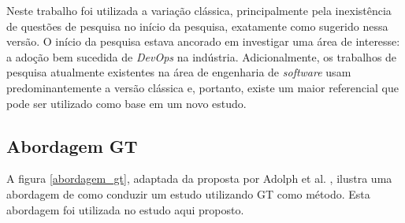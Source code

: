 Neste trabalho foi utilizada a variação clássica, principalmente pela
inexistência de questões de pesquisa no início da pesquisa, exatamente como
sugerido nessa versão. O início da pesquisa estava ancorado em investigar uma
área de interesse: a adoção bem sucedida de \textit{DevOps} na indústria.
Adicionalmente, os trabalhos de pesquisa atualmente existentes na área
de engenharia de \textit{software} usam predominantemente a versão clássica
\cite{stol2016grounded} e, portanto, existe um maior referencial que pode ser
utilizado como base em um novo estudo.

\subsection{Abordagem \acrshort{GT}}

A figura \ref{abordagem_gt}, adaptada da proposta por Adolph et al.
\cite{using_gt_adolph}, ilustra uma abordagem de como conduzir um estudo
utilizando \acrshort{GT} como método. Esta abordagem foi utilizada no estudo
aqui proposto.

%
